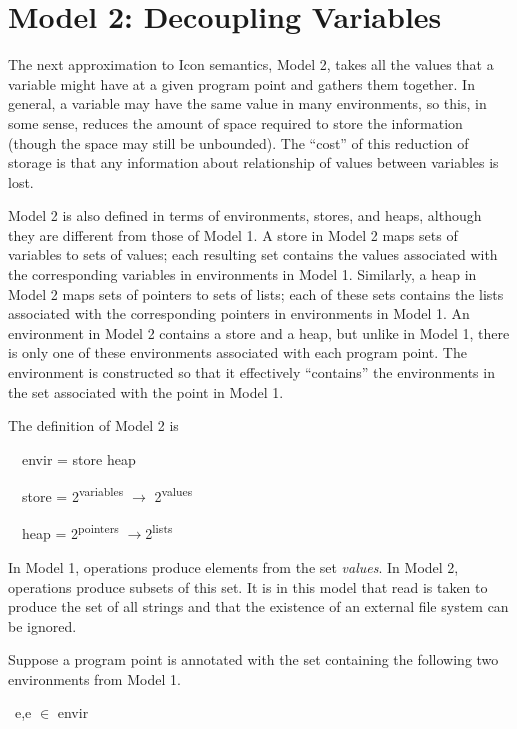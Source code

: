 \section{Model 2: Decoupling Variables}

The next approximation to Icon semantics, Model 2, takes all the
values that a variable might have at a given program point and gathers
them together. In general, a variable may have the same value in many
environments, so this, in some sense, reduces the amount of space
required to store the information (though the space may still be
unbounded). The ``cost'' of this reduction of storage is that any
information about relationship of values between variables is lost.

Model 2 is also defined in terms of environments, stores, and heaps,
although they are different from those of Model 1.  A store in Model 2
maps sets of variables to sets of values; each resulting set contains
the values associated with the corresponding variables in environments
in Model 1. Similarly, a heap in Model 2 maps sets of pointers to sets
of lists; each of these sets contains the lists associated with the
corresponding pointers in environments in Model 1. An environment in
Model 2 contains a store and a heap, but unlike in Model 1, there is
only one of these environments associated with each program point. The
environment is constructed so that it effectively ``contains'' the
environments in the set associated with the point in Model 1.

The definition of Model 2 is 

{\ttfamily\mdseries
\ \ envir\TextSubscript{[2]} = store\TextSubscript{[2]} {\texttimes} heap\TextSubscript{[2]}}

{\ttfamily\mdseries
\ \ store\TextSubscript{[2]} = 2\textsuperscript{variables} \textrm{${\rightarrow}$} 2\textsuperscript{values}}

{\ttfamily\mdseries
\ \ heap\TextSubscript{[2]} = 2\textsuperscript{pointers} $\rightarrow $2\textsuperscript{lists}}


In Model 1, operations produce elements from the set
\textit{values}. In Model 2, operations produce subsets of this
set. It is in this model that read is taken to produce the set of all
strings and that the existence of an external file system can be
ignored.

Suppose a program point is annotated with the set containing the
following two environments from Model 1.

{\ttfamily\mdseries
\ e,e ${\in}$ envir\TextSubscript{[1]}}

